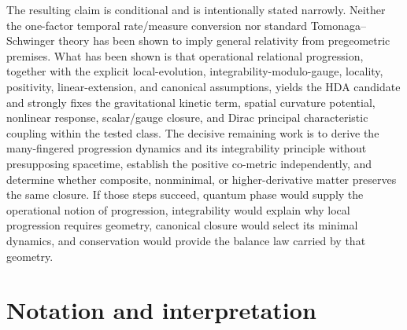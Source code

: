 \documentclass[11pt]{article}
\begin{document}
The resulting claim is conditional and is intentionally stated narrowly. Neither the one-factor temporal rate/measure conversion nor standard Tomonaga--Schwinger theory has been shown to imply general relativity from pregeometric premises. What has been shown is that operational relational progression, together with the explicit local-evolution, integrability-modulo-gauge, locality, positivity, linear-extension, and canonical assumptions, yields the HDA candidate and strongly fixes the gravitational kinetic term, spatial curvature potential, nonlinear response, scalar/gauge closure, and Dirac principal characteristic coupling within the tested class. The decisive remaining work is to derive the many-fingered progression dynamics and its integrability principle without presupposing spacetime, establish the positive co-metric independently, and determine whether composite, nonminimal, or higher-derivative matter preserves the same closure. If those steps succeed, quantum phase would supply the operational notion of progression, integrability would explain why local progression requires geometry, canonical closure would select its minimal dynamics, and conservation would provide the balance law carried by that geometry.

\appendix
\section{Notation and interpretation}
\end{document}
